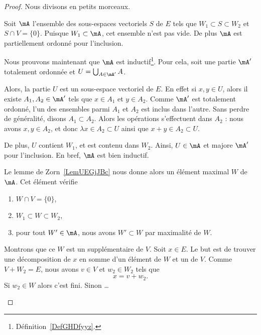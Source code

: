 \begin{proof}
	Nous divisons en petits morceaux.
	\begin{subproof}
		Soit \( \mA\) l'ensemble des sous-espaces vectoriels \( S\) de \( E\) tels que \( W_1\subset S\subset W_2\) et \( S\cap V=\{ 0 \}\). Puisque \( W_1\subset \mA\), cet ensemble n'est pas vide. De plus \( \mA\) est partiellement ordonné pour l'inclusion.

		Nous prouvons maintenant que \( \mA\) est inductif\footnote{Définition~\ref{DefGHDfyyz}.}. Pour cela, soit une partie \( \mA'\) totalement ordonnée et \( U=\bigcup_{A\in \mA'}A\).

		Alors, la partie \( U\) est un sous-espace vectoriel de \( E\). En effet si \( x,y\in U\), alors il existe \( A_1,A_2\in\mA'\) tels que \( x\in A_1\) et \( y\in A_2\). Comme \( \mA'\) est totalement ordonné, l'un des ensembles parmi \( A_1\) et \( A_2\) est inclus dans l'autre. Sans perdre de généralité, disons \( A_1\subset A_2\). Alors les opérations s'effectuent dans \( A_2 \) : nous avons \( x,y\in A_2\), et donc \( \lambda x\in A_2\subset U\) ainsi que \( x+y\in A_2\subset U\).

		De plus, \( U \) contient \( W_1 \), et est contenu dans \( W_2\). Ainsi, \( U\in \mA\) et majore \( \mA'\) pour l'inclusion. En bref, \( \mA\) est bien inductif.

		Le lemme de Zorn~\ref{LemUEGjJBc} nous donne alors un élément maximal \( W\) de \( \mA\). Cet élément vérifie
		\begin{enumerate}
			\item
			      \( W\cap V=\{ 0 \}\),
			\item
			      \( W_1\subset W\subset W_2\),
			\item
			      pour tout \( W'\in\mA\), nous avons \( W'\subset W\) par maximalité de \( W\).
		\end{enumerate}

		\spitem[Supplémentaire]
		Montrons que ce \( W\) est un supplémentaire de \( V\). Soit \( x\in E\). Le but est de trouver une décomposition de \( x\) en somme d'un élément de \( W\) et un de \( V\). Comme \( V+W_2=E\), nous avons \( v\in V\) et \( w_2\in W_2\) tels que
		\begin{equation}
			x=v+w_2.
		\end{equation}
		Si \( w_2\in W\) alors c'est fini. Sinon \ldots


\end{subproof}
\end{proof}
